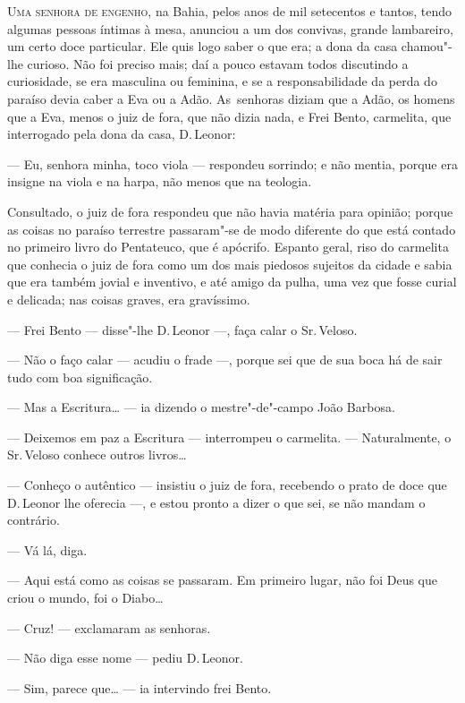 \begin{linenumbers}

\textsc{Uma senhora de engenho,} na Bahia, pelos anos de mil setecentos e tantos,
tendo algumas pessoas íntimas à mesa, anunciou a um dos convivas, grande
lambareiro, um certo doce particular. Ele quis logo saber o que era; a
dona da casa chamou"-lhe curioso. Não foi preciso mais; daí a pouco
estavam todos discutindo a curiosidade, se era masculina ou feminina, e
se a responsabilidade da perda do paraíso devia caber a Eva ou a Adão.
As~senhoras diziam que a Adão, os homens que a Eva, menos o juiz de
fora, que não dizia nada, e Frei Bento, carmelita, que interrogado pela
dona da casa, D.\,Leonor:

--- Eu, senhora minha, toco viola --- respondeu sorrindo; e não mentia,
porque era insigne na viola e na harpa, não menos que na teologia.

Consultado, o juiz de fora respondeu que não havia matéria para opinião;
porque as coisas no paraíso terrestre passaram"-se de modo diferente do
que está contado no primeiro livro do Pentateuco, que é apócrifo.
Espanto geral, riso do carmelita que conhecia o juiz de fora como um dos
mais piedosos sujeitos da cidade e sabia que era também jovial e
inventivo, e até amigo da pulha, uma vez que fosse curial e delicada;
nas coisas graves, era gravíssimo.

--- Frei Bento --- disse"-lhe D.\,Leonor ---, faça calar o Sr.\,Veloso.

--- Não o faço calar --- acudiu o frade ---, porque sei que de sua boca há
de sair tudo com boa significação.

--- Mas a Escritura\ldots{} --- ia dizendo o mestre"-de"-campo João Barbosa.

--- Deixemos em paz a Escritura --- interrompeu o carmelita. ---
Naturalmente, o Sr.\,Veloso conhece outros livros\ldots{}

--- Conheço o autêntico --- insistiu o juiz de fora, recebendo o prato de
doce que D.\,Leonor lhe oferecia ---, e estou pronto a dizer o que sei, se
não mandam o contrário.

--- Vá lá, diga.

--- Aqui está como as coisas se passaram. Em primeiro lugar, não foi Deus
que criou o mundo, foi o Diabo\ldots{}

--- Cruz! --- exclamaram as senhoras.

--- Não diga esse nome --- pediu D.\,Leonor.

--- Sim, parece que\ldots{} --- ia intervindo frei Bento.


\end{linenumbers}
